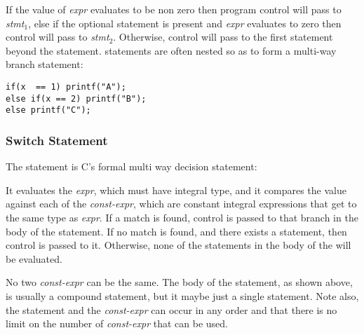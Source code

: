 If the value of {\it expr} evaluates to be non zero then program
control will pass to {\it stmt$_1$}, else if the optional 
statement is present and {\it expr} evaluates to zero then control
will pass to {\it stmt$_2$}. Otherwise, control will pass to the first
statement beyond the  statement.  statements are often
nested so as to form a multi-way branch statement:

\begin{production}
\begin{verbatim}
if(x  == 1) printf("A");
else if(x == 2) printf("B");
else printf("C");
\end{verbatim}
\end{production}

\subsubsection{Switch Statement}
\label{sec:SwitchStatement}

The  statement is C's formal multi way decision statement:

\begin{production}
\end{production}

It evaluates the {\it expr}, which must have integral type, and it
compares the value against each of the  {\it const-expr},
which are constant integral expressions that get  to the
same type as {\it expr}. If a match is found, control is passed to
that branch in the body of the  statement. If no match is
found, and there exists a  statement, then control is
passed to it. Otherwise, none of the statements in the body of
the  will be evaluated.

No two  {\it const-expr} can be the same. The body
of the  statement, as shown above, is usually a compound
statement, but it maybe just a single statement. Note also, the
 statement and the  {\it const-expr} can occur in 
any order and that there is no limit on the number of 
{\it const-expr} that can be used.

